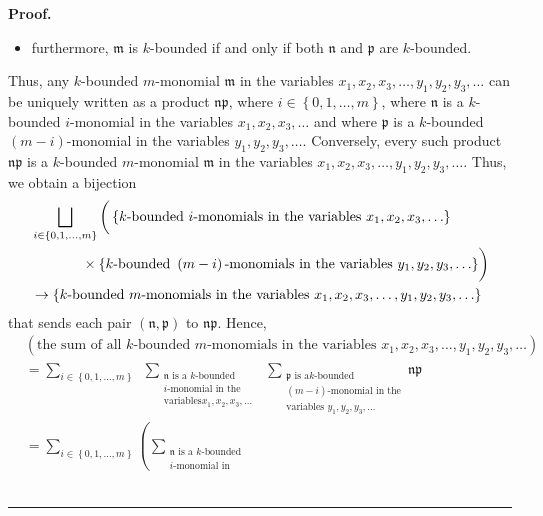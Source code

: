 \documentclass[numbers=enddot,12pt,final,onecolumn,notitlepage]{scrartcl}%
\theoremstyle{definition}
\newenvironment{proof}[1][Proof]{\noindent\textbf{#1.} }{\ \rule{0.5em}{0.5em}}
\let\sumnonlimits\sum
\renewcommand{\sum}{\sumnonlimits\limits}
\begin{document}
\begin{proof}
\begin{itemize}
\item furthermore, $\mathfrak{m}$ is $k$-bounded if and only if both
$\mathfrak{n}$ and $\mathfrak{p}$ are $k$-bounded.
\end{itemize}

Thus, any $k$-bounded $m$-monomial $\mathfrak{m}$ in the variables
$x_{1},x_{2},x_{3},\ldots,y_{1},y_{2},y_{3},\ldots$ can be uniquely written as
a product $\mathfrak{np}$, where $i\in\left\{  0,1,\ldots,m\right\}  $, where
$\mathfrak{n}$ is a $k$-bounded $i$-monomial in the variables $x_{1}%
,x_{2},x_{3},\ldots$ and where $\mathfrak{p}$ is a $k$-bounded $\left(
m-i\right)  $-monomial in the variables $y_{1},y_{2},y_{3},\ldots$.
Conversely, every such product $\mathfrak{np}$ is a $k$-bounded $m$-monomial
$\mathfrak{m}$ in the variables $x_{1},x_{2},x_{3},\ldots,y_{1},y_{2}%
,y_{3},\ldots$. Thus, we obtain a bijection%
\begin{align*}
&  \bigsqcup_{i\in\left\{  0,1,\ldots,m\right\}  }\left(
\vphantom{\frac12}\left\{  k\text{-bounded }i\text{-monomials in the variables
}x_{1},x_{2},x_{3},\ldots\right\}  \right. \\
&  \ \ \ \ \ \ \ \ \ \ \left.  \vphantom{\frac12}\times\left\{
k\text{-bounded }\left(  m-i\right)  \text{-monomials in the variables }%
y_{1},y_{2},y_{3},\ldots\right\}  \right) \\
&  \rightarrow\left\{  k\text{-bounded }m\text{-monomials in the variables
}x_{1},x_{2},x_{3},\ldots,y_{1},y_{2},y_{3},\ldots\right\}
\end{align*}
that sends each pair $\left(  \mathfrak{n},\mathfrak{p}\right)  $ to
$\mathfrak{np}$. Hence,%
\begin{align}
&  \left(  \text{the sum of all }k\text{-bounded }m\text{-monomials in the
variables }x_{1},x_{2},x_{3},\ldots,y_{1},y_{2},y_{3},\ldots\right)
\nonumber\\
&  =\sum_{i\in\left\{  0,1,\ldots,m\right\}  }\ \ \sum_{\substack{\mathfrak{n}%
\text{ is a }k\text{-bounded}\\i\text{-monomial in the}\\\text{variables
}x_{1},x_{2},x_{3},\ldots}}\ \ \sum_{\substack{\mathfrak{p}\text{ is a
}k\text{-bounded}\\\left(  m-i\right)  \text{-monomial in the}%
\\\text{variables }y_{1},y_{2},y_{3},\ldots}}\mathfrak{np}\nonumber\\
&  =\sum_{i\in\left\{  0,1,\ldots,m\right\}  }\left(  \sum
_{\substack{\mathfrak{n}\text{ is a }k\text{-bounded}\\i\text{-monomial in
}}}
\end{align}
\end{proof}
\end{document}
